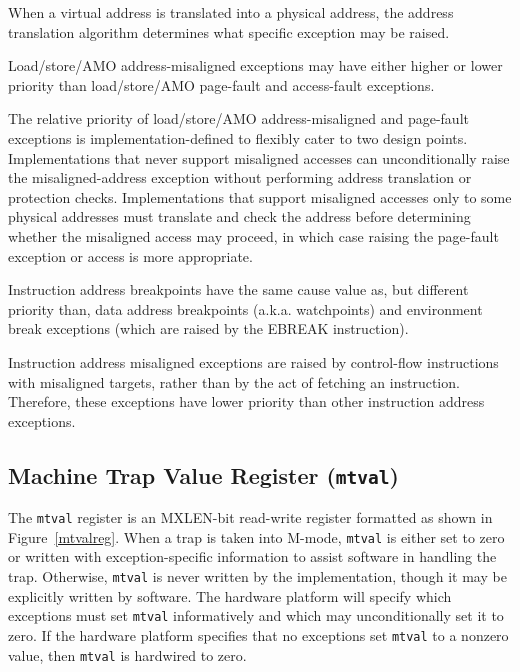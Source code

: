 When a virtual address is translated into
a physical address, the address translation
algorithm determines what specific exception may be raised.

Load/store/AMO address-misaligned exceptions may have
either higher or lower priority than load/store/AMO page-fault and
access-fault exceptions.
\begin{commentary}
The relative priority of load/store/AMO address-misaligned and page-fault
exceptions is implementation-defined to flexibly cater to two design points.
Implementations that never support misaligned accesses can unconditionally
raise the misaligned-address exception without performing address translation
or protection checks.
Implementations that support misaligned accesses only to some physical
addresses must translate and check the address before determining whether the
misaligned access may proceed, in which case raising the page-fault exception
or access is more appropriate.
\end{commentary}

\begin{commentary}
Instruction address breakpoints have the same cause value as, but
different priority than, data address breakpoints (a.k.a. watchpoints)
and environment break exceptions (which are raised by the EBREAK instruction).
\end{commentary}

\begin{commentary}
Instruction address misaligned exceptions are raised by control-flow
instructions with misaligned targets, rather than by the act of fetching an
instruction.  Therefore, these exceptions have lower priority than other
instruction address exceptions.
\end{commentary}

\FloatBarrier
\subsection{Machine Trap Value Register ({\tt mtval})}

The {\tt mtval} register is an MXLEN-bit read-write register formatted as shown
in Figure~\ref{mtvalreg}.  When a trap is taken into M-mode, {\tt mtval} is
either set to zero or written with exception-specific information to assist
software in handling the trap.  Otherwise, {\tt mtval} is never written by the
implementation, though it may be explicitly written by software.  The hardware
platform will specify which exceptions must set {\tt mtval} informatively and
which may unconditionally set it to zero.
If the hardware platform specifies that no exceptions set {\tt mtval} to a
nonzero value, then {\tt mtval} is hardwired to zero.

